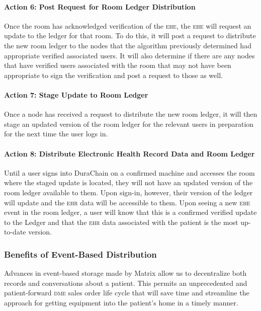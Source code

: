     \paragraph{Action 6: Post Request for Room Ledger Distribution}
    Once the room has acknowledged verification of the \textsc{ehe}, the \textsc{ehe} will request an update to the ledger for that room. To do this, it will post a request to distribute the new room ledger to the nodes that the algorithm previously determined had appropriate verified associated users. It will also determine if there are any nodes that have verified users associated with the room that may not have been appropriate to sign the verification and post a request to those as well.%

    \paragraph{Action 7: Stage Update to Room Ledger}
    Once a node has received a request to distribute the new room ledger, it will then stage an updated version of the room ledger for the relevant users in preparation for the next time the user logs in.%

    \paragraph{Action 8: Distribute Electronic Health Record Data and Room Ledger}
    Until a user signs into DuraChain on a confirmed machine and accesses the room where the staged update is located, they will not have an updated version of the room ledger available to them. Upon sign-in, however, their version of the ledger will update and the \textsc{ehr} data will be accessible to them. Upon seeing a new \textsc{ehe} event in the room ledger, a user will know that this is a confirmed verified update to the Ledger and that the \textsc{ehr} data associated with the patient is the most up-to-date version.%

  \subsubsection{Benefits of Event-Based Distribution}
  Advances in event-based storage made by Matrix allow us to decentralize both records and conversations about a patient. This permits an unprecedented and patient-forward \textsc{dme} sales order life cycle that will save time and streamline the approach for getting equipment into the patient's home in a timely manner.%

